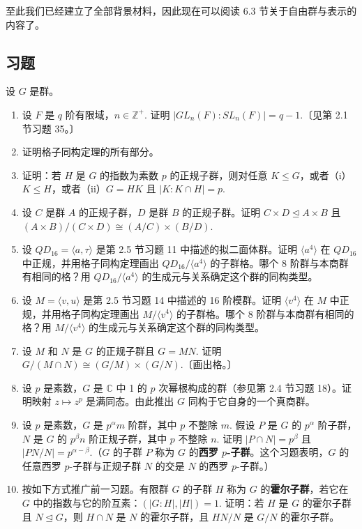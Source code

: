 至此我们已经建立了全部背景材料，因此现在可以阅读 6.3 节关于自由群与表示的内容了。

\subsection*{习题}
设 \(G\) 是群。

\begin{enumerate}
\item 设 \(F\) 是 \(q\) 阶有限域，\(n \in \mathbb{Z}^+\). 证明 \(|GL_n(F) : SL_n(F)| = q - 1\).〔见第 2.1 节习题 35。〕

\item 证明格子同构定理的所有部分。

\item 证明：若 \(H\) 是 \(G\) 的指数为素数 \(p\) 的正规子群，则对任意 \(K \leq G\)，或者（i）\(K \leq H\)，或者（ii）\(G = HK\) 且 \(|K : K \cap H| = p\).

\item 设 \(C\) 是群 \(A\) 的正规子群，\(D\) 是群 \(B\) 的正规子群。证明 \(C \times D \trianglelefteq A \times B\) 且 \((A \times B)/(C \times D) \cong (A/C) \times (B/D)\).

\item 设 \(QD_{16} = \langle a, \tau \rangle\) 是第 2.5 节习题 11 中描述的拟二面体群。证明 \(\langle a^4 \rangle\) 在 \(QD_{16}\) 中正规，并用格子同构定理画出 \(QD_{16}/\langle a^4 \rangle\) 的子群格。哪个 8 阶群与本商群有相同的格？用 \(QD_{16}/\langle a^4 \rangle\) 的生成元与关系确定这个群的同构类型。

\item 设 \(M = \langle v, u \rangle\) 是第 2.5 节习题 14 中描述的 16 阶模群。证明 \(\langle v^4 \rangle\) 在 \(M\) 中正规，并用格子同构定理画出 \(M/\langle v^4 \rangle\) 的子群格。哪个 8 阶群与本商群有相同的格？用 \(M/\langle v^4 \rangle\) 的生成元与关系确定这个群的同构类型。

\item 设 \(M\) 和 \(N\) 是 \(G\) 的正规子群且 \(G = MN\). 证明 \(G/(M \cap N) \cong (G/M) \times (G/N)\).〔画出格。〕

\item 设 \(p\) 是素数，\(G\) 是 \(\mathbb{C}\) 中 1 的 \(p\) 次幂根构成的群（参见第 2.4 节习题 18）。证明映射 \(z \mapsto z^p\) 是满同态。由此推出 \(G\) 同构于它自身的一个真商群。

\item 设 \(p\) 是素数，\(G\) 是 \(p^\alpha m\) 阶群，其中 \(p\) 不整除 \(m\). 假设 \(P\) 是 \(G\) 的 \(p^\alpha\) 阶子群，\(N\) 是 \(G\) 的 \(p^\beta n\) 阶正规子群，其中 \(p\) 不整除 \(n\). 证明 \(|P \cap N| = p^\beta\) 且 \(|PN/N| = p^{\alpha - \beta}\).（\(G\) 的子群 \(P\) 称为 \(G\) 的\textbf{西罗 \(p\)-子群}。这个习题表明，\(G\) 的任意西罗 \(p\)-子群与正规子群 \(N\) 的交是 \(N\) 的西罗 \(p\)-子群。）

\item 按如下方式推广前一习题。有限群 \(G\) 的子群 \(H\) 称为 \(G\) 的\textbf{霍尔子群}，若它在 \(G\) 中的指数与它的阶互素：\((|G : H|, |H|) = 1\). 证明：若 \(H\) 是 \(G\) 的霍尔子群且 \(N \trianglelefteq G\)，则 \(H \cap N\) 是 \(N\) 的霍尔子群，且 \(HN/N\) 是 \(G/N\) 的霍尔子群。
\end{enumerate}

